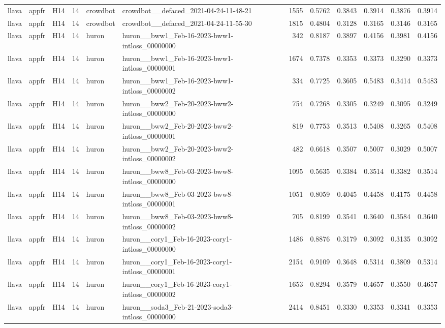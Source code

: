 \begin{table}[tbp]
\begin{tabular}{lllrllrrrrrr}
llava & appfr & H14 & 14 & crowdbot & crowdbot\_\_defaced\_2021-04-24-11-48-21 & 1555 & 0.5762 & 0.3843 & 0.3914 & 0.3876 & 0.3914 \\
llava & appfr & H14 & 14 & crowdbot & crowdbot\_\_defaced\_2021-04-24-11-55-30 & 1815 & 0.4804 & 0.3128 & 0.3165 & 0.3146 & 0.3165 \\
llava & appfr & H14 & 14 & huron & huron\_\_bww1\_Feb-16-2023-bww1-intloss\_00000000 & 342 & 0.8187 & 0.3897 & 0.4156 & 0.3981 & 0.4156 \\
llava & appfr & H14 & 14 & huron & huron\_\_bww1\_Feb-16-2023-bww1-intloss\_00000001 & 1674 & 0.7378 & 0.3353 & 0.3373 & 0.3290 & 0.3373 \\
llava & appfr & H14 & 14 & huron & huron\_\_bww1\_Feb-16-2023-bww1-intloss\_00000002 & 334 & 0.7725 & 0.3605 & 0.5483 & 0.3414 & 0.5483 \\
llava & appfr & H14 & 14 & huron & huron\_\_bww2\_Feb-20-2023-bww2-intloss\_00000000 & 754 & 0.7268 & 0.3305 & 0.3249 & 0.3095 & 0.3249 \\
llava & appfr & H14 & 14 & huron & huron\_\_bww2\_Feb-20-2023-bww2-intloss\_00000001 & 819 & 0.7753 & 0.3513 & 0.5408 & 0.3265 & 0.5408 \\
llava & appfr & H14 & 14 & huron & huron\_\_bww2\_Feb-20-2023-bww2-intloss\_00000002 & 482 & 0.6618 & 0.3507 & 0.5007 & 0.3029 & 0.5007 \\
llava & appfr & H14 & 14 & huron & huron\_\_bww8\_Feb-03-2023-bww8-intloss\_00000000 & 1095 & 0.5635 & 0.3384 & 0.3514 & 0.3382 & 0.3514 \\
llava & appfr & H14 & 14 & huron & huron\_\_bww8\_Feb-03-2023-bww8-intloss\_00000001 & 1051 & 0.8059 & 0.4045 & 0.4458 & 0.4175 & 0.4458 \\
llava & appfr & H14 & 14 & huron & huron\_\_bww8\_Feb-03-2023-bww8-intloss\_00000002 & 705 & 0.8199 & 0.3541 & 0.3640 & 0.3584 & 0.3640 \\
llava & appfr & H14 & 14 & huron & huron\_\_cory1\_Feb-16-2023-cory1-intloss\_00000000 & 1486 & 0.8876 & 0.3179 & 0.3092 & 0.3135 & 0.3092 \\
llava & appfr & H14 & 14 & huron & huron\_\_cory1\_Feb-16-2023-cory1-intloss\_00000001 & 2154 & 0.9109 & 0.3648 & 0.5314 & 0.3809 & 0.5314 \\
llava & appfr & H14 & 14 & huron & huron\_\_cory1\_Feb-16-2023-cory1-intloss\_00000002 & 1653 & 0.8294 & 0.3579 & 0.4657 & 0.3550 & 0.4657 \\
llava & appfr & H14 & 14 & huron & huron\_\_soda3\_Feb-21-2023-soda3-intloss\_00000000 & 2414 & 0.8451 & 0.3330 & 0.3353 & 0.3341 & 0.3353 \\

\end{tabular}
\end{table}
